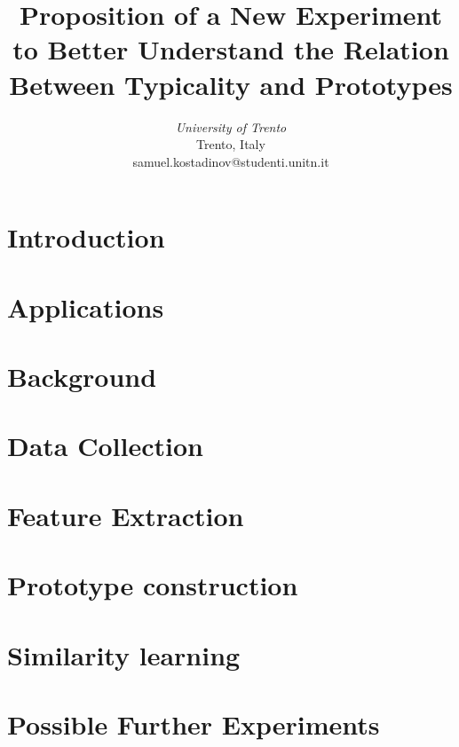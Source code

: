 \documentclass[conference]{IEEEtran}
\begin{document}
	\title{Proposition of a New Experiment to Better Understand the Relation Between Typicality and Prototypes}


	\author{
	\textit{University of Trento}\\
	Trento, Italy \\
	samuel.kostadinov@studenti.unitn.it}


	\maketitle


	\begin{abstract} 
		
	\end{abstract}


	\section{Introduction}
		
		
	\section{Applications}
	

	\section{Background}
	
				
	\section{Data Collection}


	\section{Feature Extraction\label{sec:fe}}


	\section{Prototype construction}


	\section{Similarity learning}
	
			
	\section{Possible Further Experiments}
	
		
	\nocite{*}
	\printbibliography
\end{document}

